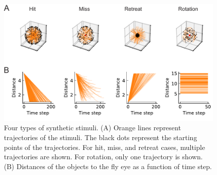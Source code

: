 \documentclass[9pt,lineno]{elife}
\begin{document}
\begin{figure}
\includegraphics[width=\linewidth]{figures/stimuli_1_paper.pdf}
\caption{Four types of synthetic stimuli. (A) Orange lines represent trajectories of the stimuli. The black dots represent the starting points of the trajectories. For hit, miss, and retreat cases, multiple trajectories are shown. For rotation, only one trajectory is shown. (B) Distances of the objects to the fly eye as a function of time step.}
\label{fig:stimuli_traj}
\end{figure}
\end{document}
